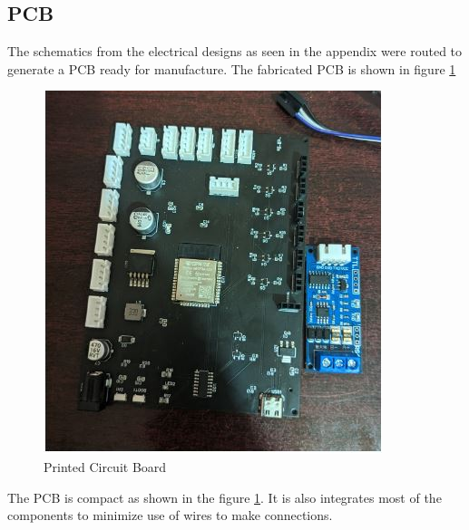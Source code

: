 \subsection{PCB}
The schematics from the electrical designs as seen in the appendix were routed to generate a PCB ready for manufacture. The fabricated PCB is shown in figure \ref{fig:pcb_fab}
\begin{center}
	\begin{figure}[H]
		\centering
		\includegraphics[width=0.7\linewidth]{Figures/pcb 1.JPG}
		\caption[Printed Circuit Board view]{Printed Circuit Board}
		\label{fig:pcb_fab}
	\end{figure}
\end{center}
The PCB is compact as shown in the figure \ref{fig:pcb_fab}. It is also integrates most of the components to minimize use of wires to make connections.

